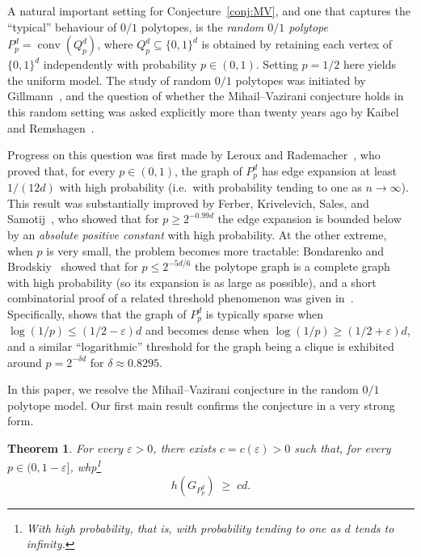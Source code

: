 \documentclass{article}
\newtheorem{theorem}{Theorem}
\theoremstyle{definition}
\newcommand{\eps}{\varepsilon}
\begin{document}
A natural important setting for Conjecture~\ref{conj:MV}, and one that captures the
``typical'' behaviour of $0/1$ polytopes, is the \emph{random $0/1$ polytope}
$P^d_p = \operatorname{conv}(Q_p^d)$, where $Q_p^d \subseteq \{0,1\}^d$ is
obtained by retaining each vertex of $\{0,1\}^d$ independently with probability
$p \in (0,1)$.  Setting $p = 1/2$ here yields the uniform model.  The study of
random $0/1$ polytopes was initiated by Gillmann~\cite{Gillmann}, and the
question of whether the Mihail--Vazirani conjecture holds in this random setting
was asked explicitly more than twenty years ago by Kaibel and Remshagen~\cite{KR03}.
 
Progress on this question was first made by Leroux and
Rademacher~\cite{LR22}, who proved that, for every $p \in (0,1)$, the graph
of $P^d_p$ has edge expansion at least $1/(12d)$ with high probability (i.e.\
with probability tending to one as $n\to\infty$).  This result was substantially
improved by Ferber, Krivelevich, Sales, and Samotij~\cite{FKSS26}, who showed
that for $p \ge 2^{-0.99d}$ the edge expansion is bounded below by an
\emph{absolute positive constant} with high probability.  At the other extreme,
when $p$ is very small, the problem becomes more tractable: Bondarenko and
Brodskiy~\cite{BB} showed that for $p \le 2^{-5d/6}$ the polytope graph is a
complete graph with high probability (so its expansion is as large as possible),
and a short combinatorial proof of a related threshold phenomenon was given
in~\cite{BEF25}. Specifically, \cite{BEF25} shows that the graph of $P^d_p$ is typically sparse when 
$\log(1/p)\le (1/2-\eps)d$ and becomes dense when $\log(1/p)\ge (1/2+\eps)d$, 
and a similar ``logarithmic'' threshold for the graph being a clique is exhibited around $p = 2^{-\delta d}$ for $\delta \approx 0.8295$.
 
In this paper, we resolve the Mihail--Vazirani conjecture in the
random $0/1$ polytope model. %
Our first main result confirms the conjecture in a very strong form.
 
\begin{theorem}\label{thm:main1}
 For every $\varepsilon > 0$, there exists $c=c(\eps)>0$ such that, for every $p \in (0,1-\eps]$, whp\footnote{With high probability, that is, with probability tending to one as $d$ tends to infinity.}
  \[
    h(G_{P^d_p}) \;\ge\; cd.
  \]
\end{theorem}
 
\end{document}
